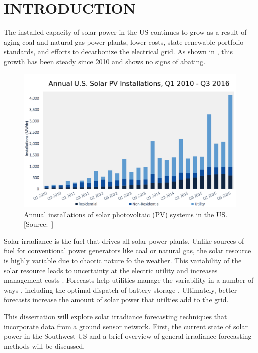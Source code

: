 \chapter{INTRODUCTION}
\label{chap:intro}

The installed capacity of solar power in the US continues to grow as a
result of aging coal and natural gas power plants, lower costs,
state renewable portfolio standards, and efforts to decarbonize the
electrical grid.
As shown in , this growth has been steady since
2010 and shows no signs of abating.

\begin{figure}[htb]
  \includegraphics[width=\textwidth]{figs/solar_installations.png}
  \caption[Annual installations of solar PV in the US]{Annual
    installations of solar photovoltaic (PV) systems in the
    US. [Source:~\cite{GTM/SEIA2016}]}
\label{fig:solarinstall}
\end{figure}

Solar irradiance is the fuel that drives all solar power plants.
Unlike sources of fuel for conventional power generators like coal or
natural gas, the solar resource is highly variable due to chaotic
nature fo the weather.
This variability of the solar resource leads to uncertainty at the
electric utility and increases management costs \citep{Joskow2011}.
Forecasts help utilities manage the variability in a number of ways
\citep{Kleissl2013,Inman2013}, including the optimal dispatch of
battery storage \citep{Cormode2015}.
Ultimately, better forecasts increase the amount of solar power that
utilties add to the grid.

This dissertation will explore solar irradiance forecasting techniques
that incorporate data from a ground sensor network.
First, the current state of solar power in the Southwest US and a
brief overview of general irradiance forecasting methods will be
discussed.

